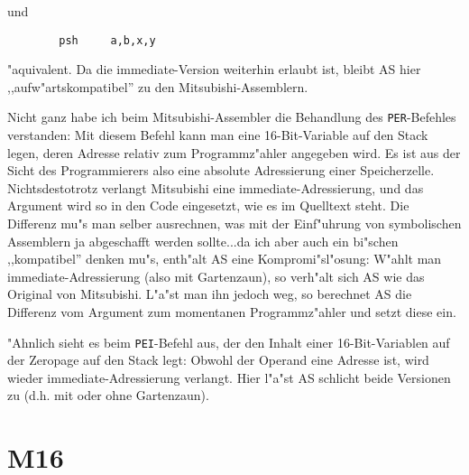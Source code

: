 \documentclass[12pt,a4paper,twoside]{report}
\newcommand{\tty}[1]{{\tt #1}}
\begin{document}
und
\begin{verbatim}
        psh     a,b,x,y
\end{verbatim}
"aquivalent.  Da die immediate-Version weiterhin erlaubt ist, bleibt
AS hier ,,aufw"artskompatibel'' zu den Mitsubishi-Assemblern.
\par
Nicht ganz habe ich beim Mitsubishi-Assembler die Behandlung des
\tty{PER}-Befehles verstanden: Mit diesem Befehl kann man eine
16-Bit-Variable auf den Stack legen, deren Adresse relativ zum
Programmz"ahler angegeben wird.  Es ist aus der Sicht des Programmierers
also eine absolute Adressierung einer Speicherzelle.  Nichtsdestotrotz
verlangt Mitsubishi eine immediate-Adressierung, und das Argument wird so
in den Code eingesetzt, wie es im Quelltext steht.  Die Differenz mu"s
man selber ausrechnen, was mit der Einf"uhrung von symbolischen Assemblern
ja abgeschafft werden sollte...da ich aber auch ein bi"schen ,,kompatibel''
denken mu"s, enth"alt AS eine Kompromi"sl"osung: W"ahlt man
immediate-Adressierung (also mit Gartenzaun), so verh"alt sich AS wie das
Original von Mitsubishi.  L"a"st man ihn jedoch weg, so berechnet AS die
Differenz vom Argument zum momentanen Programmz"ahler und setzt diese
ein.
\par
"Ahnlich sieht es beim \tty{PEI}-Befehl aus, der den Inhalt einer
16-Bit-Variablen auf der Zeropage auf den Stack legt:  Obwohl der Operand
eine Adresse ist, wird wieder immediate-Adressierung verlangt.  Hier
l"a"st AS schlicht beide Versionen zu (d.h. mit oder ohne Gartenzaun).


\section{M16}
\end{document}
